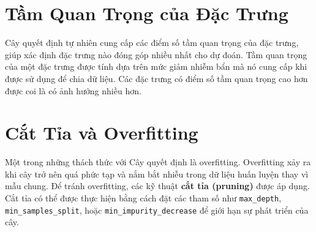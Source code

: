 \documentclass{article}
\begin{document}
\section{Tầm Quan Trọng của Đặc Trưng}
Cây quyết định tự nhiên cung cấp các điểm số tầm quan trọng của đặc trưng, giúp xác định đặc trưng nào đóng góp nhiều nhất cho dự đoán. Tầm quan trọng của một đặc trưng được tính dựa trên mức giảm nhiễm bẩn mà nó cung cấp khi được sử dụng để chia dữ liệu. Các đặc trưng có điểm số tầm quan trọng cao hơn được coi là có ảnh hưởng nhiều hơn.

\section{Cắt Tỉa và Overfitting}
Một trong những thách thức với Cây quyết định là overfitting. Overfitting xảy ra khi cây trở nên quá phức tạp và nắm bắt nhiễu trong dữ liệu huấn luyện thay vì mẫu chung. Để tránh overfitting, các kỹ thuật \textbf{cắt tỉa (pruning)} được áp dụng. Cắt tỉa có thể được thực hiện bằng cách đặt các tham số như \texttt{max\_depth}, \texttt{min\_samples\_split}, hoặc \texttt{min\_impurity\_decrease} để giới hạn sự phát triển của cây.
\end{document}
